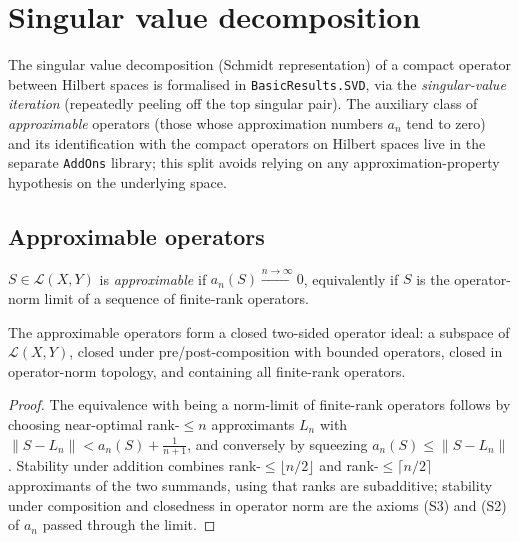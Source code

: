 \chapter{Singular value decomposition}
\label{ch:svd}

The singular value decomposition (Schmidt representation) of a compact
operator between Hilbert spaces is formalised in \texttt{BasicResults.SVD},
via the \emph{singular-value iteration} (repeatedly peeling off the top
singular pair). The auxiliary class of \emph{approximable} operators (those
whose approximation numbers $a_n$ tend to zero) and its identification with
the compact operators on Hilbert spaces live in the separate
\texttt{AddOns} library; this split avoids relying on any
approximation-property hypothesis on the underlying space.

\section{Approximable operators}
\label{sec:svd-approximable}

\begin{definition}
\label{def:approximable}
\leanok
{}
$S \in \mathcal{L}(X, Y)$ is \emph{approximable} if
$a_n(S) \xrightarrow{n \to \infty} 0$, equivalently if $S$ is the
operator-norm limit of a sequence of finite-rank operators.
\end{definition}

\begin{proposition}
\label{prop:approximable-closure}
\leanok
{}
The approximable operators form a closed two-sided operator ideal: a
subspace of $\mathcal{L}(X, Y)$, closed under pre/post-composition with
bounded operators, closed in operator-norm topology, and containing all
finite-rank operators.
\end{proposition}
\begin{proof}
\leanok
The equivalence with being a norm-limit of finite-rank operators follows by
choosing near-optimal rank-$\le n$ approximants $L_n$ with
$\|S - L_n\| < a_n(S) + \tfrac{1}{n+1}$, and conversely by squeezing
$a_n(S) \le \|S - L_n\|$. Stability under addition combines rank-$\le
\lfloor n/2 \rfloor$ and rank-$\le \lceil n/2 \rceil$ approximants of the
two summands, using that ranks are subadditive; stability under
composition and closedness in operator norm are the axioms (S3) and (S2)
of $a_n$ passed through the limit.
\end{proof}

